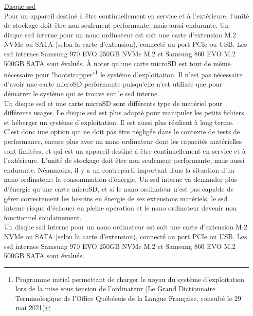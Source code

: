 \par\underline{Disque \acrshort{ssd}}
\vspace{\baselineskip}
\\
\noindent Pour un appareil destiné à être continuellement en service et à l'extérieure, l'unité de stockage doit être non seulement performante, mais aussi endurante. Un disque \acrshort{ssd} interne pour un nano ordinateur est soit une carte d'extension M.2 NVMe ou SATA (selon la carte d'extension), connecté au port PCIe ou USB. Les \acrshort{ssd} internes Samsung 970 EVO 250GB NVMe M.2 et Samsung 860 EVO M.2 500GB SATA sont évalués. À noter qu'une carte microSD est tout de même nécessaire pour "bootstrapper"\footnote{Programme initial permettant de charger le noyau du système d'exploitation lors de la mise sous tension de l'ordinateur (Le Grand Dictionnaire Terminologique de l'Office Québécois de la Langue Française, consulté le 29 mai 2021)} le système d'exploitation. Il n'est pas nécessaire d'avoir une carte microSD performante puisqu'elle n'est utilisée que pour démarrer le système qui se trouve sur le \acrshort{ssd} interne. 
\vspace{\baselineskip}
\\
\noindent Un disque \acrshort{ssd} et une carte microSD sont différents type de matériel pour différents usages. Le disque \acrshort{ssd} est plus adapté pour manipuler les petits fichiers et héberger un système d'exploitation. Il est aussi plus résilient à long terme. C'est donc une option qui ne doit pas être négligée dans le contexte de tests de performance, encore plus avec un nano ordinateur dont les capacités matérielles sont limitées, et qui est un appareil destiné à être continuellement en service et à l'extérieure. L'unité de stockage doit être non seulement performante, mais aussi endurante. Néanmoins, il y a un contreparti important dans la situation d'un nano ordinateur: la consommation d'énergie. Un \acrshort{ssd} interne va demander plus d'énergie qu'une carte microSD, et si le nano ordinateur n'est pas capable de gérer correctement les besoins en énergie de ses extensions matériels, le \acrshort{ssd} interne risque d'échouer en pleine opération et le nano ordinateur devenir non fonctionnel soudainement.
\vspace{\baselineskip}
\\
\noindent Un disque \acrshort{ssd} interne pour un nano ordinateur est soit une carte d'extension M.2 NVMe ou SATA (selon la carte d'extension), connecté au port PCIe ou USB. Les \acrshort{ssd} internes Samsung 970 EVO 250GB NVMe M.2 et Samsung 860 EVO M.2 500GB SATA sont évalués.
